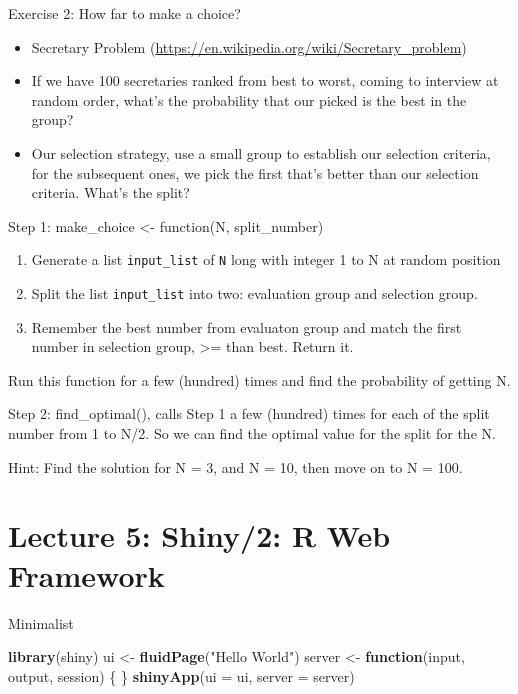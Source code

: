 \documentclass[
  10pt,
  ignorenonframetext,
  serif]{beamer}
\newenvironment{Shaded}{\begin{snugshade}}{\end{snugshade}}
\newcommand{\ControlFlowTok}[1]{\textcolor[rgb]{0.13,0.29,0.53}{\textbf{#1}}}
\newcommand{\DataTypeTok}[1]{\textcolor[rgb]{0.13,0.29,0.53}{#1}}
\newcommand{\KeywordTok}[1]{\textcolor[rgb]{0.13,0.29,0.53}{\textbf{#1}}}
\newcommand{\NormalTok}[1]{#1}
\newcommand{\StringTok}[1]{\textcolor[rgb]{0.31,0.60,0.02}{#1}}
\providecommand{\tightlist}{%
  \setlength{\itemsep}{0pt}\setlength{\parskip}{0pt}}
\begin{document}
\begin{frame}[fragile]{Exercise 2: How far to make a choice?}
\protect\hypertarget{exercise-2-how-far-to-make-a-choice}{}
\begin{itemize}
\tightlist
\item
  Secretary Problem
  (\url{https://en.wikipedia.org/wiki/Secretary_problem})
\item
  If we have 100 secretaries ranked from best to worst, coming to
  interview at random order, what's the probability that our picked is
  the best in the group?
\item
  Our selection strategy, use a small group to establish our selection
  criteria, for the subsequent ones, we pick the first that's better
  than our selection criteria. What's the split?
\end{itemize}

Step 1: make\_choice \textless- function(N, split\_number)

\begin{enumerate}
\tightlist
\item
  Generate a list \texttt{input\_list} of \texttt{N} long with integer 1
  to N at random position
\item
  Split the list \texttt{input\_list} into two: evaluation group and
  selection group.
\item
  Remember the best number from evaluaton group and match the first
  number in selection group, \textgreater= than best. Return it.
\end{enumerate}

Run this function for a few (hundred) times and find the probability of
getting N.

Step 2: find\_optimal(), calls Step 1 a few (hundred) times for each of
the split number from 1 to N/2. So we can find the optimal value for the
split for the N.

Hint: Find the solution for N = 3, and N = 10, then move on to N = 100.
\end{frame}

\hypertarget{lecture-5-shiny2-r-web-framework}{%
\section{Lecture 5: Shiny/2: R Web
Framework}\label{lecture-5-shiny2-r-web-framework}}

\begin{frame}[fragile]{Minimalist}
\protect\hypertarget{minimalist}{}
\begin{Shaded}
\begin{Highlighting}[]
\KeywordTok{library}\NormalTok{(shiny)}
\NormalTok{ui \textless{}{-}}\StringTok{ }\KeywordTok{fluidPage}\NormalTok{(}\StringTok{"Hello World"}\NormalTok{)}
\NormalTok{server \textless{}{-}}\StringTok{ }\ControlFlowTok{function}\NormalTok{(input, output, session) \{ \}}
\KeywordTok{shinyApp}\NormalTok{(}\DataTypeTok{ui =}\NormalTok{ ui, }\DataTypeTok{server =}\NormalTok{ server)}
\end{Highlighting}
\end{Shaded}
\end{frame}
\end{document}
